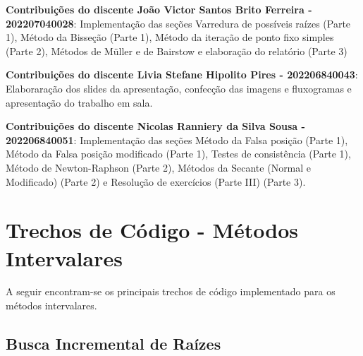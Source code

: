 \documentclass[
	12pt,				%
	openright,			%
	oneside,			%
	a4paper,			%
	english,			%
	brazil				%
	]{abntex2}
\begin{document}
\textbf{Contribuições do discente João Victor Santos Brito Ferreira - 202207040028}: Implementação das seções Varredura de possíveis raízes (Parte 1), Método da Bisseção (Parte 1), Método da iteração de ponto fixo simples (Parte 2), Métodos de Müller e de Bairstow e elaboração do relatório (Parte 3) \\\vspace{0.3cm}

\textbf{Contribuições do discente Livia Stefane Hipolito Pires - 202206840043}: Elaboraração dos slides da apresentação, confecção das imagens e fluxogramas e apresentação do trabalho em sala. \\\vspace{0.3cm}

\textbf{Contribuições do discente Nicolas Ranniery da Silva Sousa - 202206840051}: Implementação das seções Método da Falsa posição (Parte 1), Método da Falsa posição modificado (Parte 1), Testes de consistência (Parte 1), Método de Newton-Raphson (Parte 2), Métodos da Secante (Normal e Modificado) (Parte 2) e Resolução de exercícios (Parte III) (Parte 3).


\postextual

\appendix

\chapter{Trechos de Código - Métodos Intervalares}

A seguir encontram-se os principais trechos de código implementado para os métodos intervalares.

\section{Busca Incremental de Raízes}
\end{document}
